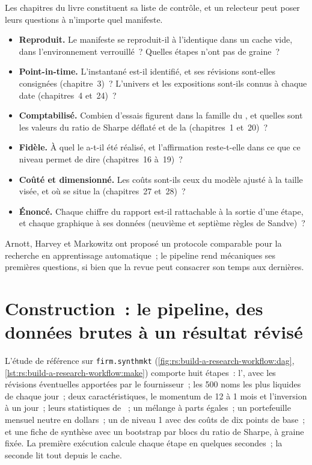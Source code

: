 Les chapitres du livre constituent sa liste de contrôle, et un relecteur peut poser leurs questions à n'importe quel manifeste.
\begin{itemize}
\item \textbf{Reproduit.} Le manifeste se reproduit-il à l'identique dans un cache vide, dans l'environnement verrouillé~? Quelles étapes n'ont pas de graine~?
\item \textbf{Point-in-time.} L'instantané est-il identifié, et ses révisions sont-elles consignées (chapitre~3)~? L'univers et les expositions sont-ils connus à chaque date
(chapitres~4 et~24)~?
\item \textbf{Comptabilisé.} Combien d'essais figurent dans la famille du , et quelles sont les valeurs du ratio de Sharpe déflaté et de la 
(chapitres~1 et~20)~?
\item \textbf{Fidèle.} À quel  le  a-t-il été réalisé, et l'affirmation reste-t-elle dans ce que ce niveau permet de dire (chapitres~16 à~19)~?
\item \textbf{Coûté et dimensionné.} Les coûts sont-ils ceux du modèle ajusté à la taille visée, et où se situe la  (chapitres~27 et~28)~?
\item \textbf{Énoncé.} Chaque chiffre du rapport est-il rattachable à la sortie d'une étape, et chaque graphique à ses données (neuvième et septième règles de Sandve)~?
\end{itemize}
Arnott, Harvey et Markowitz ont proposé un protocole comparable pour la recherche en apprentissage automatique~; le pipeline rend mécaniques ses premières questions, si bien que la revue
peut consacrer son temps aux dernières.

\section{Construction~: le pipeline, des données brutes à un résultat révisé}

L'étude de référence sur \texttt{firm.synthmkt} (\cref{fig:rs:build-a-research-workflow:dag}, \cref{lst:rs:build-a-research-workflow:make}) comporte huit étapes~:
l', avec les révisions éventuelles apportées par le fournisseur~; les 500 noms les plus liquides de chaque jour~; deux caractéristiques, le momentum de 12 à 1 mois et l'inversion à un jour~;
leurs statistiques de ~; un mélange à parts égales~; un portefeuille mensuel neutre en dollars~; un  de niveau 1 avec des coûts de dix points de base~; et une fiche de synthèse avec un
bootstrap par blocs du ratio de Sharpe, à graine fixée. La première exécution calcule chaque étape en quelques secondes~; la seconde lit tout depuis le cache.

